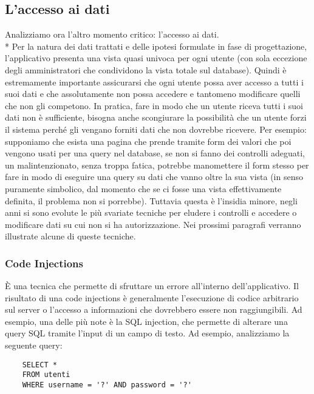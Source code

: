 \documentclass[12pt]{article}
\begin{document}
\bigskip
\subsection{L'accesso ai dati}
Analizziamo ora l’altro momento critico: l’accesso ai dati.\\*
Per la natura dei dati trattati e delle ipotesi formulate in fase di progettazione, l’applicativo presenta una vista quasi univoca per ogni utente (con sola eccezione degli amministratori che condividono la vista totale sul database). Quindi è estremamente importante assicurarsi che ogni utente possa aver accesso a tutti i suoi dati e che assolutamente non possa accedere e tantomeno modificare quelli che non gli competono.
In pratica, fare in modo che un utente riceva tutti i suoi dati non è sufficiente, bisogna anche scongiurare la possibilità che un utente forzi il sistema perché gli vengano forniti dati che non dovrebbe ricevere. Per esempio: supponiamo che esista una pagina che prende tramite form dei valori che poi vengono usati per una query nel database, se non si fanno dei controlli adeguati, un malintenzionato, senza troppa fatica, potrebbe manomettere il form stesso per fare in modo di eseguire una query su dati che vanno oltre la sua vista (in senso puramente simbolico, dal momento che se ci fosse una vista effettivamente definita, il problema non si porrebbe).
Tuttavia questa è l’insidia minore, negli anni si sono evolute le più svariate tecniche per eludere i controlli e accedere o modificare dati su cui non si ha autorizzazione.
Nei prossimi paragrafi verranno illustrate alcune di queste tecniche.

\bigskip
\subsubsection{Code Injections}
È una tecnica che permette di sfruttare un errore all’interno dell’applicativo. Il risultato di una code injections è generalmente l’esecuzione di codice arbitrario sul server o l’accesso a informazioni che dovrebbero essere non raggiungibili.
Ad esempio, una delle più note è la SQL injection, che permette di alterare una query SQL tramite l’input di un campo di testo. Ad esempio, analizziamo la seguente query:


\begin{verbatim}
    SELECT * 
    FROM utenti 
    WHERE username = '?' AND password = '?'
\end{verbatim}
\end{document}
